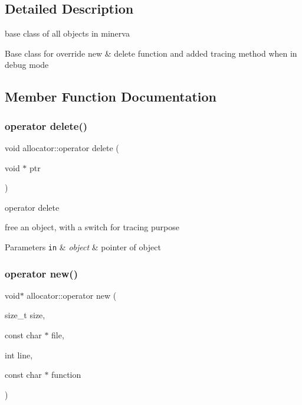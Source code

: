 \subsection{Detailed Description}
base class of all objects in minerva 

Base class for override new \& delete function and added tracing method when in debug mode 

\subsection{Member Function Documentation}
\mbox{\label{classallocator_ab4c71bd9e5a544dc78839865978a2cf8}} 
\subsubsection{\texorpdfstring{operator delete()}{operator delete()}}
{\footnotesize\ttfamily void allocator\+::operator delete (\begin{DoxyParamCaption}\item[{void $\ast$}]{ptr }\end{DoxyParamCaption})\hspace{0.3cm}{\ttfamily [inline]}}



operator delete 

free an object, with a switch for tracing purpose


\begin{DoxyParams}[1]{Parameters}
\mbox{\tt in}  & {\em object} & pointer of object \\
\hline
\end{DoxyParams}
\mbox{\label{classallocator_abf5144276a9c22e8edf9845ee5c03b96}} 
\subsubsection{\texorpdfstring{operator new()}{operator new()}}
{\footnotesize\ttfamily void$\ast$ allocator\+::operator new (\begin{DoxyParamCaption}\item[{size\+\_\+t}]{size,  }\item[{const char $\ast$}]{file,  }\item[{int}]{line,  }\item[{const char $\ast$}]{function }\end{DoxyParamCaption})\hspace{0.3cm}{\ttfamily [inline]}}




